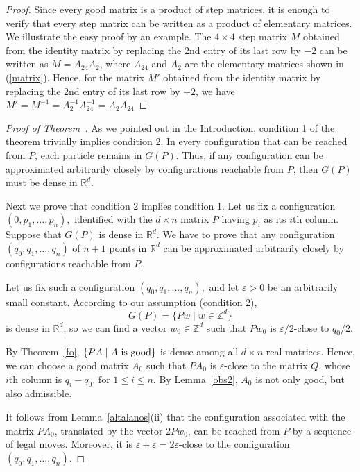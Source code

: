 \documentclass{article}
\theoremstyle{definition}
\newcommand{\R}{\mathbb R}
\newcommand{\Z}{\mathbb Z}
\def\marrow{{\boldmath {\marginpar[\hfill$\rightarrow \rightarrow$]{$\leftarrow \leftarrow$}}}}
\def\janos#1{{\sc J\'anos megjegyz\'ese: }{\marrow\sf #1}}
\begin{document}
\begin{proof}
Since every good matrix is a product of step matrices, it is enough to verify that every step matrix can be written as a product of elementary matrices. We illustrate the easy proof by an example. The $4\times 4$ step matrix $M$ obtained from the identity matrix by replacing the 2nd entry of its last row by $-2$ can be written as $M=A_{24}A_2$, where $A_{24}$ and $A_2$ are the elementary matrices shown in (\ref{matrix}). Hence, for the matrix $M'$ obtained from the identity matrix by replacing the 2nd entry of its last row by $+2$, we have $M'=M^{-1}=A_2^{-1}A_{24}^{-1}=A_2A_{24}$ %
\end{proof}

\begin{proof}[Proof of Theorem~\ref2] As we pointed out in the Introduction, condition 1 of the theorem trivially implies condition 2. In every configuration that can be reached from $P$, each particle remains in $G(P)$. Thus, if any configuration can be approximated arbitrarily closely by configurations reachable from $P$, then $G(P)$ must be dense in $\R^d$.
\medskip

Next we prove that condition 2 implies condition 1. Let us fix a configuration $(0,p_1,\dots,p_n),$ identified with the $d\times n$ matrix $P$ having $p_i$ as its $i$\/th column. Suppose that $G(P)$ is dense in $\R^d$. We have to prove that any configuration $(q_0,q_1,\dots,q_n)$ of $n+1$ points in $\R^d$ can be approximated arbitrarily closely by configurations reachable from $P$.
\smallskip

Let us fix such a configuration $(q_0,q_1,\dots,q_n),$ and  let $\varepsilon>0$ be an arbitrarily small constant. According to our assumption (condition 2),
$$G(P)=\{Pw\mid w\in\Z^d\}$$ is dense in $\R^d$, so we can find a vector $w_0\in \Z^d$ such that $Pw_0$ is $\varepsilon/2$-close to $q_0/2$.

By Theorem~\ref{fo}, $\{PA\mid A \hbox{ is good}\}$ is dense among all $d\times n$ real matrices. Hence, we can choose a good matrix $A_0$ such that $PA_0$ is $\varepsilon$-close to the matrix $Q$, whose $i$\/th column is $q_i-q_0$, for $1\le i\le n.$ By Lemma~\ref{obs2}, $A_0$ is not only good, but also admissible.

It follows from Lemma~\ref{altalanos}(ii) that the configuration associated with the matrix $PA_0$, translated by the vector $2Pw_0$, can be reached from $P$ by a sequence of legal moves. Moreover, it is $\varepsilon+\varepsilon=2\varepsilon$-close to the configuration $(q_0,q_1,\ldots,q_n).$ \end{proof}
\end{document}
